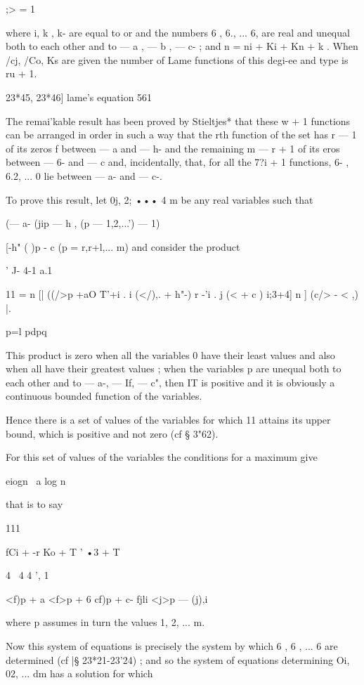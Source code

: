 {{{{{{{;> = 1

where i, k , k- are equal to or and the numbers 6 , 6., ... 6, are
real and unequal both to each other and to — a , — b , — c- ; and n =
ni + Ki + Kn + k . When /cj, /Co, Ks are given the number of Lame
functions of this degi-ee and type is ru + 1.



23*45, 23*46] lame's equation 561

The remai'kable result has been proved by Stieltjes* that these w + 1
functions can be arranged in order in such a way that the rth function
of the set has r — 1 of its zeros f between — a and — h- and the
remaining m — r + 1 of its eros between — 6- and — c and,
incidentally, that, for all the 7?i + 1 functions, 6- , 6.2, ... 0 lie
between — a- and — c-.

To prove this result, let 0j, 2; ••• 4 m be any real variables such
that

(— a- (jip — h , (p — 1,2,...') — 1)

[-h" ( )p - c (p = r,r+l,... m) and consider the product

 ' J- 4-1 a.1

11 = n [| ((/>p +aO T'+i . i (</),. + h"-) r -'i . j (< + c ) i;3+4] n
] (c/> - < ,) |.

p=l pdpq

This product is zero when all the variables 0 have their least values
and also when all have their greatest values ; when the variables p
are unequal both to each other and to — a-, — If, — c", then IT is
positive and it is obviously a continuous bounded function of the
variables.

Hence there is a set of values of the variables for which 11 attains
its upper bound, which is positive and not zero (cf § 3"62).

For this set of values of the variables the conditions for a maximum
give

eiogn \ a log n \



that is to say



111

fCi + -r Ko + T ' •3 + T

4 \ 4 4 ', 1 \

<f)p + a <f>p + 6 cf)p + c- fjli <j>p — (j),i



where p assumes in turn the values 1, 2, ... m.

Now this system of equations is precisely the system by which 6 , 6 ,
... 6 are determined (cf |§ 23*21-23'24) ; and so the system of
equations determining Oi, 02, ... dm has a solution for which

}}}}}}}
